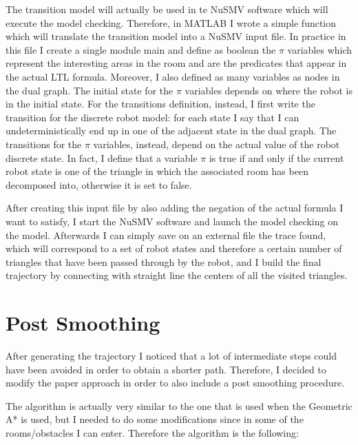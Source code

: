 \documentclass[conference,12pt]{IEEEtran}
\begin{document}
The transition model will actually be used in te NuSMV software which will execute the model checking. Therefore, in MATLAB I wrote a simple function which will translate the transition model into a NuSMV input file. In practice in this file I create a single module main and define as boolean the $\pi$ variables which represent the interesting areas in the room and are the predicates that appear in the actual LTL formula. Moreover, I also defined as many variables as nodes in the dual graph. The initial state for the $\pi$ variables depends on where the robot is in the initial state. For the transitions definition, instead, I first write the transition for the discrete robot model: for each state I say that I can undeterministically end up in one of the adjacent state in the dual graph. The transitions for the $\pi$ variables, instead, depend on the actual value of the robot discrete state. In fact, I define that a variable $\pi$ is true if and only if the current robot state is one of the triangle in which the associated room has been decomposed into, otherwise it is set to false.

After creating this input file by also adding the negation of the actual formula I want to satisfy, I start the NuSMV software and launch the model checking on the model. Afterwards I can simply save on an external file the trace found, which will correspond to a set of robot states and therefore a certain number of triangles that have been passed through by the robot, and I build the final trajectory by connecting with straight line the centers of all the visited triangles.

\section{Post Smoothing}

After generating the trajectory I noticed that a lot of intermediate steps could have been avoided in order to obtain a shorter path. Therefore, I decided to modify the paper approach in order to also include a post smoothing procedure.

The algorithm is actually very similar to the one that is used when the Geometric A* is used, but I needed to do some modifications since in some of the rooms/obstacles I can enter. Therefore the algorithm is the following:
\end{document}
